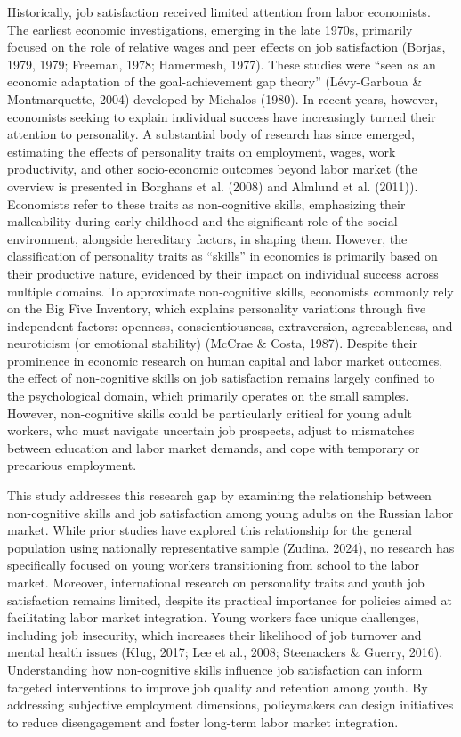 \documentclass[
]{interact}
\begin{document}
Historically, job satisfaction received limited attention from labor
economists. The earliest economic investigations, emerging in the late
1970s, primarily focused on the role of relative wages and peer effects
on job satisfaction (Borjas, 1979, 1979; Freeman, 1978; Hamermesh,
1977). These studies were ``seen as an economic adaptation of the
goal-achievement gap theory'' (Lévy-Garboua \& Montmarquette, 2004)
developed by Michalos (1980). In recent years, however, economists
seeking to explain individual success have increasingly turned their
attention to personality. A substantial body of research has since
emerged, estimating the effects of personality traits on employment,
wages, work productivity, and other socio-economic outcomes beyond labor
market (the overview is presented in Borghans et al. (2008) and Almlund
et al. (2011)). Economists refer to these traits as non-cognitive
skills, emphasizing their malleability during early childhood and the
significant role of the social environment, alongside hereditary
factors, in shaping them. However, the classification of personality
traits as ``skills'' in economics is primarily based on their productive
nature, evidenced by their impact on individual success across multiple
domains. To approximate non-cognitive skills, economists commonly rely
on the Big Five Inventory, which explains personality variations through
five independent factors: openness, conscientiousness, extraversion,
agreeableness, and neuroticism (or emotional stability) (McCrae \&
Costa, 1987). Despite their prominence in economic research on human
capital and labor market outcomes, the effect of non-cognitive skills on
job satisfaction remains largely confined to the psychological domain,
which primarily operates on the small samples. However, non-cognitive
skills could be particularly critical for young adult workers, who must
navigate uncertain job prospects, adjust to mismatches between education
and labor market demands, and cope with temporary or precarious
employment.

This study addresses this research gap by examining the relationship
between non-cognitive skills and job satisfaction among young adults on
the Russian labor market. While prior studies have explored this
relationship for the general population using nationally representative
sample (Zudina, 2024), no research has specifically focused on young
workers transitioning from school to the labor market. Moreover,
international research on personality traits and youth job satisfaction
remains limited, despite its practical importance for policies aimed at
facilitating labor market integration. Young workers face unique
challenges, including job insecurity, which increases their likelihood
of job turnover and mental health issues (Klug, 2017; Lee et al., 2008;
Steenackers \& Guerry, 2016). Understanding how non-cognitive skills
influence job satisfaction can inform targeted interventions to improve
job quality and retention among youth. By addressing subjective
employment dimensions, policymakers can design initiatives to reduce
disengagement and foster long-term labor market integration.
\end{document}
